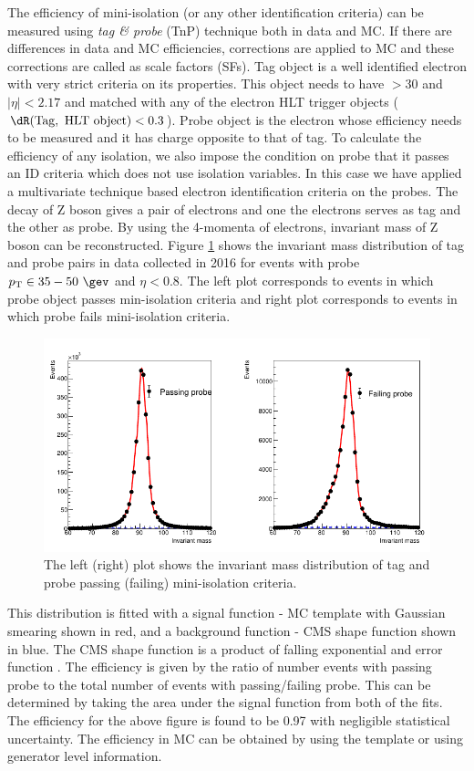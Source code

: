 The efficiency of mini-isolation (or any other identification criteria) can be measured using \textit{tag \& probe} (TnP) technique both in data and MC. If there are differences in data and MC efficiencies, corrections are applied to MC and these corrections are called as scale factors (SFs). Tag object is a well identified electron with very strict criteria on its properties. This object needs to have \pt $>30$ \gev and $|\eta|<2.17$ and matched with any of the electron HLT trigger objects ($\dR(\mathrm{Tag,\ HLT\ object})<0.3$). Probe object is the electron whose efficiency needs to be measured and it has charge opposite to that of tag. To calculate the efficiency of any isolation, we also impose the condition on probe that it passes an ID criteria which does not use isolation variables. In this case we have applied a multivariate technique based electron identification criteria on the probes. The decay of Z boson gives a pair of electrons and one the electrons serves as tag and the other as probe. By using the 4-momenta of electrons, invariant mass of Z boson can be reconstructed. Figure \ref{fig:bin25_el_sc_eta_0p00To0p80_el_pt_35p00To50p00} shows the invariant mass distribution of tag and probe pairs in data collected in 2016 for events with probe $\pt \in 35 - 50\ \gev$ and $\eta < 0.8$. The left plot corresponds to events in which probe object passes min-isolation criteria and right plot corresponds to events in which probe fails mini-isolation criteria. 
\begin{figure}[h!]
\centering
\includegraphics[width=0.9\linewidth]{../Figures/Chap2/bin25_el_sc_eta_0p00To0p80_el_pt_35p00To50p00}
\captionsetup{width=.9\linewidth}
\caption[TnP fit for MiniIso pass/fail]{The left (right) plot shows the invariant mass distribution of tag and probe passing (failing) mini-isolation criteria.}
\label{fig:bin25_el_sc_eta_0p00To0p80_el_pt_35p00To50p00}
\end{figure}
This distribution is fitted with a signal function - MC template with Gaussian smearing shown in red, and a background function - CMS shape function shown in blue. The CMS shape function is a product of falling exponential and error function \cite{Meyer:2239058}. The efficiency is given by the ratio of number events with passing probe to the total number of events with passing/failing probe. This can be determined by taking the area under the signal function from both of the fits. The efficiency for the above figure is found to be 0.97 with negligible statistical uncertainty. The efficiency in MC can be obtained by using the template or using generator level information.

